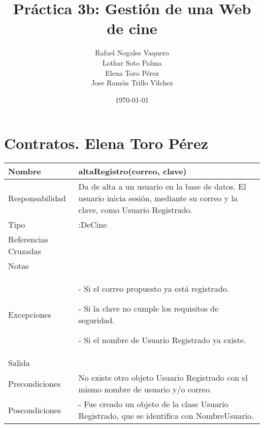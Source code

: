 \documentclass{article}
\title{Práctica 3b: Gestión de una Web de cine}
\author{Rafael Nogales Vaquero
\\Lothar Soto Palma
\\Elena Toro Pérez
\\Jose Ramón Trillo Vilchez}
\date{\today}
\begin{document}
\maketitle
\section{Contratos. Elena Toro Pérez}
\begin{table}[h]
\begin{tabular}{|l|l|l|l|l|l|}
\hline
\multicolumn{2}{|p{3cm}|}{Nombre} & \multicolumn{3}{p{8cm}|}{\textbf{altaRegistro(correo, clave)}}\\
\hline
\multicolumn{2}{|p{3cm}|}{Responsabilidad} & \multicolumn{4}{p{8cm}|}{Da de alta a un usuario en la base de datos. El usuario inicia sesión, mediante su correo y la clave, como Usuario Registrado.} \\
\hline
\multicolumn{2}{|p{3cm}|}{Tipo} & \multicolumn{4}{p{8cm}|}{:DeCine} \\
\hline
\multicolumn{2}{|p{3cm}|}{Referencias Cruzadas} & \multicolumn{4}{p{8cm}|}{} \\
\hline
\multicolumn{2}{|p{3cm}|}{Notas} & \multicolumn{4}{p{8cm}|}{} \\
\hline
\multicolumn{2}{|p{3cm}|}{Excepciones} & \multicolumn{4}{p{8cm}|}{- Si el correo propuesto ya está registrado.

- Si la clave no cumple los requisitos de seguridad.

- Si el nombre de Usuario Registrado ya existe.} \\
\hline
\multicolumn{2}{|p{3cm}|}{Salida} & \multicolumn{4}{p{8cm}|}{} \\
\hline
\multicolumn{2}{|p{3cm}|}{Precondiciones} & \multicolumn{4}{p{8cm}|}{No existe otro objeto Usuario Registrado con el mismo nombre de usuario y/o correo.} \\
\hline
\multicolumn{2}{|p{3cm}|}{Poscondiciones} & \multicolumn{4}{p{8cm}|}{- Fue creado un objeto de la clase Usuario Registrado, que se identifica con NombreUsuario.} \\
\hline
\end{tabular}
\end{table}
\end{document}
